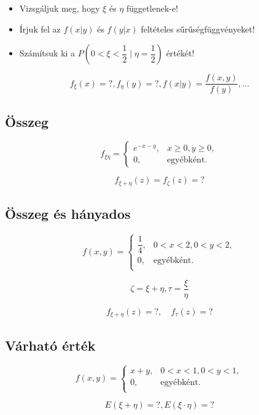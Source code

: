 \documentclass[a4paper]{article}
\newenvironment{solution}
{\color{RoyalBlue}}{\bigskip}
\begin{document}
\begin{itemize}
\item Vizsgáljuk meg, hogy $\xi$ és $\eta$ függetlenek-e!
\item Írjuk fel az $f(x|y)$ és $f(y|x)$ feltételes sűrűségfüggvényeket!
\item Számítsuk ki a $P\left(0 < \xi < \dfrac{1}{2}\mid\eta = \dfrac{1}{2}\right)$ értékét!
\end{itemize}

\begin{solution}
\[
f_{\xi}(x) = ?, f_{\eta}(y) = ?, f(x|y) = \dfrac{f(x, y)}{f(y)}, \ldots
\]
\end{solution}

\subsection{Összeg}

\[
f_{\xi\eta} =
\begin{cases}
e^{-x-y}, & x \geq 0, y \geq 0, \\
0, & \text{egyébként}.
\end{cases}
\]

\[
f_{\xi + \eta}(z) = f_{\zeta}(z) = ?
\]

\subsection{Összeg és hányados}

\[
f(x, y) = \begin{cases}
\dfrac{1}{4}, & 0 < x < 2, 0 < y < 2, \\
0, & \text{egyébként}. \\
\end{cases}
\]

\[
\zeta = \xi + \eta, \tau = \dfrac{\xi}{\eta}
\]

\[
f_{\xi + \eta}(z) = ?, \quad f_{\tau}(z) = ?
\]

\subsection{Várható érték}

\[
f(x, y) = \begin{cases}
x + y, & 0 < x < 1, 0 < y < 1, \\
0, & \text{egyébként}. \\
\end{cases}
\]

\[
E(\xi + \eta) = ?, E(\xi \cdot \eta) = ?
\]
\end{document}

